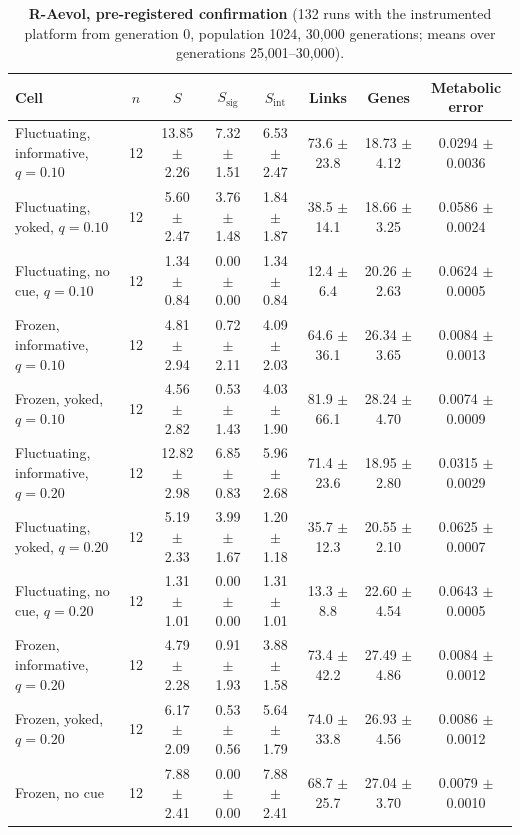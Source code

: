 \begin{table}[!ht]\small
\caption{\textbf{R-Aevol, pre-registered confirmation} (132 runs with the instrumented platform from generation 0, population 1024, 30{,}000 generations; means over generations 25{,}001--30{,}000).}
\begin{tabular}{@{}lccccccc@{}}\toprule
Cell & $n$ & $S$ & $S_\mathrm{sig}$ & $S_\mathrm{int}$ & Links & Genes & Metabolic error\\\midrule
Fluctuating, informative, $q=0.10$ & 12 & 13.85 $\pm$ 2.26 & 7.32 $\pm$ 1.51 & 6.53 $\pm$ 2.47 & 73.6 $\pm$ 23.8 & 18.73 $\pm$ 4.12 & 0.0294 $\pm$ 0.0036\\
Fluctuating, yoked, $q=0.10$ & 12 & 5.60 $\pm$ 2.47 & 3.76 $\pm$ 1.48 & 1.84 $\pm$ 1.87 & 38.5 $\pm$ 14.1 & 18.66 $\pm$ 3.25 & 0.0586 $\pm$ 0.0024\\
Fluctuating, no cue, $q=0.10$ & 12 & 1.34 $\pm$ 0.84 & 0.00 $\pm$ 0.00 & 1.34 $\pm$ 0.84 & 12.4 $\pm$ 6.4 & 20.26 $\pm$ 2.63 & 0.0624 $\pm$ 0.0005\\
Frozen, informative, $q=0.10$ & 12 & 4.81 $\pm$ 2.94 & 0.72 $\pm$ 2.11 & 4.09 $\pm$ 2.03 & 64.6 $\pm$ 36.1 & 26.34 $\pm$ 3.65 & 0.0084 $\pm$ 0.0013\\
Frozen, yoked, $q=0.10$ & 12 & 4.56 $\pm$ 2.82 & 0.53 $\pm$ 1.43 & 4.03 $\pm$ 1.90 & 81.9 $\pm$ 66.1 & 28.24 $\pm$ 4.70 & 0.0074 $\pm$ 0.0009\\
Fluctuating, informative, $q=0.20$ & 12 & 12.82 $\pm$ 2.98 & 6.85 $\pm$ 0.83 & 5.96 $\pm$ 2.68 & 71.4 $\pm$ 23.6 & 18.95 $\pm$ 2.80 & 0.0315 $\pm$ 0.0029\\
Fluctuating, yoked, $q=0.20$ & 12 & 5.19 $\pm$ 2.33 & 3.99 $\pm$ 1.67 & 1.20 $\pm$ 1.18 & 35.7 $\pm$ 12.3 & 20.55 $\pm$ 2.10 & 0.0625 $\pm$ 0.0007\\
Fluctuating, no cue, $q=0.20$ & 12 & 1.31 $\pm$ 1.01 & 0.00 $\pm$ 0.00 & 1.31 $\pm$ 1.01 & 13.3 $\pm$ 8.8 & 22.60 $\pm$ 4.54 & 0.0643 $\pm$ 0.0005\\
Frozen, informative, $q=0.20$ & 12 & 4.79 $\pm$ 2.28 & 0.91 $\pm$ 1.93 & 3.88 $\pm$ 1.58 & 73.4 $\pm$ 42.2 & 27.49 $\pm$ 4.86 & 0.0084 $\pm$ 0.0012\\
Frozen, yoked, $q=0.20$ & 12 & 6.17 $\pm$ 2.09 & 0.53 $\pm$ 0.56 & 5.64 $\pm$ 1.79 & 74.0 $\pm$ 33.8 & 26.93 $\pm$ 4.56 & 0.0086 $\pm$ 0.0012\\
Frozen, no cue & 12 & 7.88 $\pm$ 2.41 & 0.00 $\pm$ 0.00 & 7.88 $\pm$ 2.41 & 68.7 $\pm$ 25.7 & 27.04 $\pm$ 3.70 & 0.0079 $\pm$ 0.0010\\
\bottomrule\end{tabular}\end{table}

